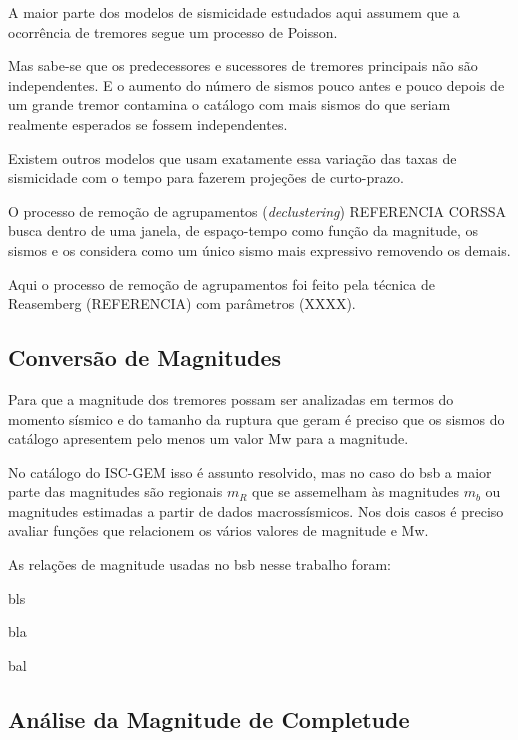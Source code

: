 A maior parte dos modelos de sismicidade estudados aqui assumem que a ocorrência de
tremores segue um processo de Poisson.

Mas sabe-se que os predecessores e sucessores de tremores principais não são independentes.
E o aumento do número de sismos pouco antes e pouco depois de um grande tremor contamina
o catálogo com mais sismos do que seriam realmente esperados se fossem independentes.

Existem outros modelos que usam exatamente essa variação das taxas de sismicidade com o tempo
para fazerem projeções de curto-prazo.

O processo de remoção de agrupamentos (\emph{declustering}) REFERENCIA CORSSA busca
dentro de uma janela, de espaço-tempo como função da magnitude, os sismos e os considera como um único
sismo mais expressivo removendo os demais.

Aqui o processo de remoção de agrupamentos foi feito pela técnica de Reasemberg (REFERENCIA) com parâmetros
(XXXX).

\subsection{Conversão de Magnitudes}
\label{sec:mag_conv}

Para que a magnitude dos tremores possam ser analizadas em termos do momento sísmico e do 
tamanho da ruptura que geram é preciso que os sismos do catálogo apresentem pelo menos um valor
\gls{Mw} para a magnitude.

No catálogo do ISC-GEM isso é assunto resolvido, mas no caso do \gls{bsb} a maior parte das magnitudes
são regionais $m_R$ que se assemelham às magnitudes $m_b$ ou magnitudes estimadas a partir de dados
macrossísmicos. Nos dois casos é preciso avaliar funções que relacionem os vários valores de magnitude
e \gls{Mw}.

As relações de magnitude usadas no \gls{bsb} nesse trabalho foram:

bls

bla

bal



\subsection{Análise da Magnitude de Completude}
\label{sec:completeness}

